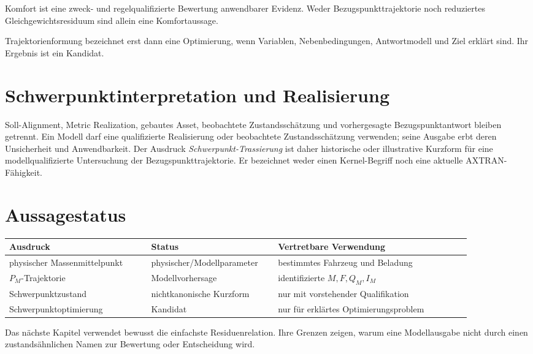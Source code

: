 \begin{definition}
\label{def:operational-comfort}
Komfort ist eine zweck- und regelqualifizierte Bewertung anwendbarer Evidenz.
Weder Bezugspunkttrajektorie noch reduziertes Gleichgewichtsresiduum sind
allein eine Komfortaussage.
\end{definition}

\begin{definition}
\label{def:trajectory-shaping}
Trajektorienformung bezeichnet erst dann eine Optimierung, wenn Variablen,
Nebenbedingungen, Antwortmodell und Ziel erklärt sind. Ihr Ergebnis ist ein
Kandidat.
\end{definition}

\section{Schwerpunktinterpretation und Realisierung}

Soll-Alignment, Metric Realization, gebautes Asset, beobachtete
Zustandsschätzung und vorhergesagte Bezugspunktantwort bleiben getrennt. Ein
Modell darf eine qualifizierte Realisierung oder beobachtete Zustandsschätzung
verwenden; seine Ausgabe erbt deren Unsicherheit und Anwendbarkeit. Der
Ausdruck \emph{Schwerpunkt-Trassierung} ist daher historische oder
illustrative Kurzform für eine modellqualifizierte Untersuchung der
Bezugspunkttrajektorie. Er bezeichnet weder einen Kernel-Begriff noch eine
aktuelle AXTRAN-Fähigkeit.

\section{Aussagestatus}

\begin{center}
\small
\begin{tabular}{p{0.28\linewidth}p{0.25\linewidth}p{0.38\linewidth}}
\toprule
Ausdruck & Status & Vertretbare Verwendung\\
\midrule
physischer Massenmittelpunkt & physischer/Modellparameter & bestimmtes Fahrzeug und Beladung\\
\(P_M\)-Trajektorie & Modellvorhersage & identifizierte \(M,F,Q_M,I_M\)\\
Schwerpunktzustand & nichtkanonische Kurzform & nur mit vorstehender Qualifikation\\
Schwerpunktoptimierung & Kandidat & nur für erklärtes Optimierungsproblem\\
\bottomrule
\end{tabular}
\end{center}

Das nächste Kapitel verwendet bewusst die einfachste Residuenrelation. Ihre
Grenzen zeigen, warum eine Modellausgabe nicht durch einen zustandsähnlichen
Namen zur Bewertung oder Entscheidung wird.
